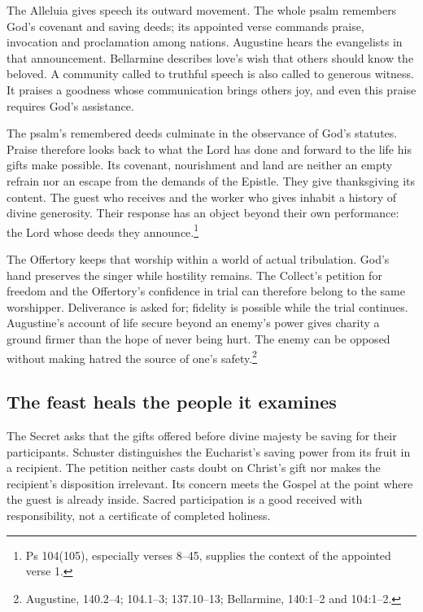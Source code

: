 The Alleluia gives speech its outward movement. The whole psalm remembers
God's covenant and saving deeds; its appointed verse commands praise,
invocation and proclamation among nations. Augustine hears the evangelists
in that announcement. Bellarmine describes love's wish that others should
know the beloved. A community called to truthful speech is also called
to generous witness. It praises a goodness whose communication brings
others joy, and even this praise requires God's assistance.

The psalm's remembered deeds culminate in the observance of God's
statutes. Praise therefore looks back to what the Lord has done and
forward to the life his gifts make possible. Its covenant, nourishment
and land are neither an empty refrain nor an escape from the demands
of the Epistle. They give thanksgiving its content. The guest who
receives and the worker who gives inhabit a history of divine
generosity. Their response has an object beyond their own performance:
the Lord whose deeds they announce.\footnote{Ps 104(105), especially
verses 8--45, supplies the context of the appointed verse 1.}

The Offertory keeps that worship within a world of actual tribulation.
God's hand preserves the singer while hostility remains. The Collect's
petition for freedom and the Offertory's confidence in trial can therefore
belong to the same worshipper. Deliverance is asked for; fidelity is
possible while the trial continues. Augustine's account of life secure
beyond an enemy's power gives charity a ground firmer than the hope of
never being hurt. The enemy can be opposed without making hatred the
source of one's safety.\footnote{Augustine,  140.2--4; 104.1--3; 137.10--13; Bellarmine,
 140:1--2 and 104:1--2.}

\subsection{The feast heals the people it examines}

The Secret asks that the gifts offered before divine majesty be saving
for their participants. Schuster distinguishes the Eucharist's saving
power from its fruit in a recipient. The petition neither casts doubt
on Christ's gift nor makes the recipient's disposition irrelevant.
Its concern meets the Gospel at the point where the guest is already
inside. Sacred participation is a good received with responsibility,
not a certificate of completed holiness.

